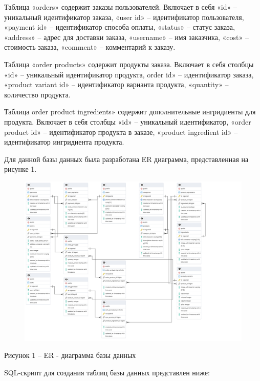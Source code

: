 \documentclass[a4paper,14pt]{extarticle}
\begin{document}
  Таблица «orders» содержит заказы пользователей. Включает в себя «id» -- уникальный идентификатор заказа, «user id» -- идентификатор пользователя, «payment id» -- идентификатор способа оплаты, «status» -- статус заказа, «address» -- адрес для доставки заказа, «username» -- имя заказчика, «cost» -- стоимость заказа, «comment» -- комментарий к заказу.

  Таблица «order products» содержит продукты заказа. Включает в себя столбцы «id» -- уникальный идентификатор продукта, order id» -- идентификатор заказа, «product variant id» -- идентификатор варианта продукта, «quantity» -- количество продукта.

  Таблица order product ingredients» содержит дополнительные ингридиенты для продукта. Включает в себя столбцы «id» -- уникальный идентификатор, «order product id» -- идентификатор продукта в заказе, «product ingredient id» -- идентификатор ингридиента продукта.

  Для данной базы данных была разработана ER диаграмма, представленная на рисунке 1.

  \pagebreak
  \begin{figure}[h]
    \centering
    \includegraphics[width=1\linewidth]{img/er}
  \end{figure}
  \begin{center}
    Рисунок 1 – ER - диаграмма базы данных
  \end{center}

  SQL-скрипт для создания таблиц базы данных представлен ниже:
\end{document}
